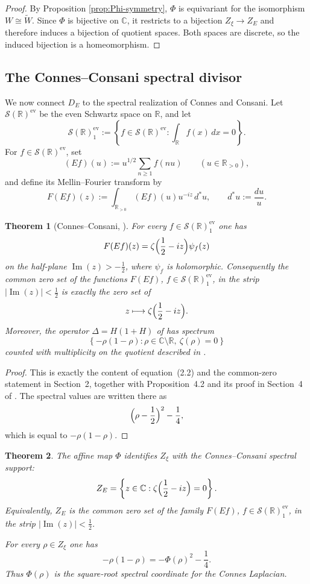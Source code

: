 \documentclass[11pt,a4paper]{article}
\newtheorem{theorem}{Theorem}[section]
\theoremstyle{definition}
\theoremstyle{remark}
\DeclareMathOperator{\Ima}{Im}
\newcommand{\RR}{\mathbb R}
\newcommand{\CC}{\mathbb C}
\newcommand{\cS}{\mathcal S}
\begin{document}
\begin{proof}
By Proposition \ref{prop:Phi-symmetry}, $\Phi$ is equivariant for the isomorphism $W\cong\widetilde W$.  Since $\Phi$ is bijective on $\CC$, it restricts to a bijection $Z_\xi\to Z_E$ and therefore induces a bijection of quotient spaces.  Both spaces are discrete, so the induced bijection is a homeomorphism.
\end{proof}

\subsection{The Connes--Consani spectral divisor}

We now connect $D_E$ to the spectral realization of Connes and Consani.  Let $\cS(\RR)^{\mathrm{ev}}$ be the even Schwartz space on $\RR$, and let
\[
\cS(\RR)^{\mathrm{ev}}_1:=\left\{f\in\cS(\RR)^{\mathrm{ev}}: \int_{\RR} f(x)\,dx=0\right\}.
\]
For $f\in\cS(\RR)^{\mathrm{ev}}$, set
\[
(Ef)(u):=u^{1/2}\sum_{n\ge1} f(nu)
\qquad (u\in\RR_{>0}),
\]
and define its Mellin--Fourier transform by
\[
F(Ef)(z):=\int_{\RR_{>0}} (Ef)(u)u^{-iz}\,d^*u,
\qquad d^*u:=\frac{du}{u}.
\]

\begin{theorem}[Connes--Consani, \cite{ConnesConsaniCycles}]\label{thm:Connes-CC}
For every $f\in \cS(\RR)^{\mathrm{ev}}_1$ one has
\[
F(Ef)(z)=\zeta\Bigl(\frac12-iz\Bigr)\psi_f(z)
\]
on the half-plane $\Ima(z)>-\frac12$, where $\psi_f$ is holomorphic.  Consequently the common zero set of the functions $F(Ef)$, $f\in\cS(\RR)^{\mathrm{ev}}_1$, in the strip $|\Ima(z)|<\frac12$ is exactly the zero set of
\[
z\longmapsto \zeta\Bigl(\frac12-iz\Bigr).
\]
Moreover, the operator $\Delta=H(1+H)$ of \cite[Section~4]{ConnesConsaniCycles} has spectrum
\[
\left\{-\rho(1-\rho):\rho\in\CC\setminus\RR,\ \zeta(\rho)=0\right\}
\]
counted with multiplicity on the quotient described in \cite[Proposition~4.2]{ConnesConsaniCycles}.
\end{theorem}

\begin{proof}
This is exactly the content of equation~(2.2) and the common-zero statement in Section~2, together with Proposition~4.2 and its proof in Section~4 of \cite{ConnesConsaniCycles}.  The spectral values are written there as
\[
\Bigl(\rho-\frac12\Bigr)^2-\frac14,
\]
which is equal to $-\rho(1-\rho)$.
\end{proof}

\begin{theorem}\label{thm:bridge}
The affine map $\Phi$ identifies $Z_\xi$ with the Connes--Consani spectral support:
\[
Z_E=\left\{z\in\CC:\zeta\Bigl(\frac12-iz\Bigr)=0\right\}.
\]
Equivalently, $Z_E$ is the common zero set of the family $F(Ef)$, $f\in\cS(\RR)^{\mathrm{ev}}_1$, in the strip $|\Ima(z)|<\frac12$.

For every $\rho\in Z_\xi$ one has
\[
-\rho(1-\rho)=-\Phi(\rho)^2-\frac14.
\]
Thus $\Phi(\rho)$ is the square-root spectral coordinate for the Connes Laplacian.
\end{theorem}
\end{document}
